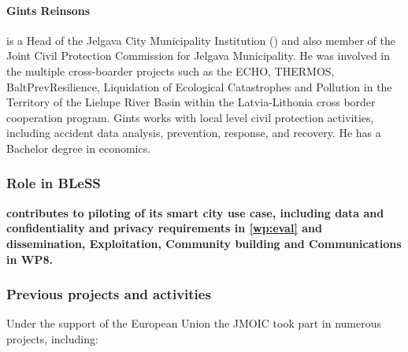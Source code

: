 \documentclass[a4paper,11pt]{article}
\newcommand{\project}[1]{\textbf{#1}\xspace}
\newcommand{\BLESS}{\project{BLeSS}}
\newcommand{\TheProject}{\BLESS}
\begin{document}
\paragraph{Gints Reinsons} is a Head of the Jelgava City Municipality Institution (\JMOIClong) and also member of the Joint Civil Protection Commission for Jelgava Municipality. He was involved in the multiple cross-boarder projects such as the ECHO, THERMOS, BaltPrevResilience, Liquidation of Ecological Catastrophes and Pollution in the Territory of the Lielupe River Basin within the Latvia-Lithonia cross border cooperation program. Gints works with local level civil protection activities, including accident data analysis, prevention, response, and recovery. He has a Bachelor degree in economics.

\bigskip
\subsubsection*{Role in \TheProject{}}

\textbf{\JMOIC{} contributes to piloting of its smart city use case, including data and confidentiality and privacy requirements in \ref{wp:eval} and dissemination, Exploitation, Community building and Communications in WP8.}

\subsubsection*{Previous projects and activities}

Under the support of the European Union the JMOIC took part in numerous projects, including:
\end{document}
